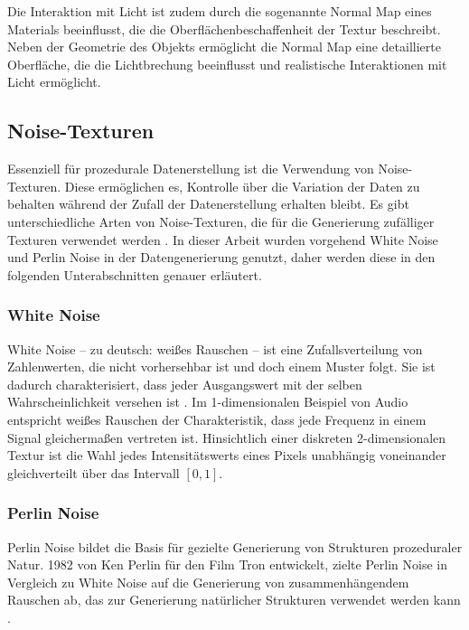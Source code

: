 Die Interaktion mit Licht ist zudem durch die sogenannte Normal Map eines Materials beeinflusst, die die Oberflächenbeschaffenheit der Textur beschreibt. Neben der Geometrie des Objekts ermöglicht die Normal Map eine detaillierte Oberfläche, die die Lichtbrechung beeinflusst und realistische Interaktionen mit Licht ermöglicht.


\subsection{Noise-Texturen}
\label{sec:noise}

Essenziell für prozedurale Datenerstellung ist die Verwendung von Noise-Texturen. Diese ermöglichen es, Kontrolle über die Variation der Daten zu behalten während der Zufall der Datenerstellung erhalten bleibt. Es gibt unterschiedliche Arten von Noise-Texturen, die für die Generierung zufälliger Texturen verwendet werden \cite{noise_generation}. In dieser Arbeit wurden vorgehend White Noise und Perlin Noise in der Datengenerierung genutzt, daher werden diese in den folgenden Unterabschnitten genauer erläutert.

\subsubsection{White Noise}

White Noise -- zu deutsch: weißes Rauschen -- ist eine Zufallsverteilung von Zahlenwerten, die nicht vorhersehbar ist und doch einem Muster folgt. Sie ist dadurch charakterisiert, dass jeder Ausgangswert mit der selben Wahrscheinlichkeit versehen ist \cite{white_noise}. Im 1-dimensionalen Beispiel von Audio entspricht weißes Rauschen der Charakteristik, dass jede Frequenz in einem Signal gleichermaßen vertreten ist. Hinsichtlich einer diskreten 2-dimensionalen Textur ist die Wahl jedes Intensitätswerts eines Pixels unabhängig voneinander gleichverteilt über das Intervall $[0, 1]$.

\subsubsection{Perlin Noise}

Perlin Noise bildet die Basis für gezielte Generierung von Strukturen prozeduraler Natur. 1982 von Ken Perlin für den Film Tron entwickelt, zielte Perlin Noise in Vergleich zu White Noise auf die Generierung von zusammenhängendem Rauschen ab, das zur Generierung natürlicher Strukturen verwendet werden kann \cite{perlin_noise_original,perlin_noise_extension}.

